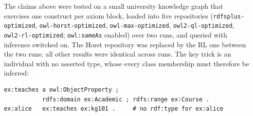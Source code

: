 \documentclass[11pt,a4paper]{article}
\begin{document}
The claims above were tested on a small university knowledge graph that
exercises one construct per axiom block, loaded into five repositories
(\texttt{rdfsplus-optimized}, \texttt{owl-horst-optimized},
\texttt{owl-max-optimized}, \texttt{owl2-ql-optimized},
\texttt{owl2-rl-optimized}; \texttt{owl:sameAs} enabled) over two runs, and
queried with inference switched on. The Horst repository was replaced by the
RL one between the two runs; all other results were identical across runs.
The key trick is an
individual with no asserted type, whose every class membership must therefore
be inferred:
\begin{lstlisting}
ex:teaches a owl:ObjectProperty ;
           rdfs:domain ex:Academic ; rdfs:range ex:Course .
ex:alice   ex:teaches ex:kg101 .     # no rdf:type for ex:alice
\end{lstlisting}
\end{document}
